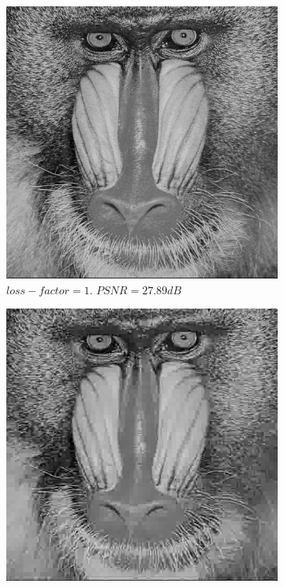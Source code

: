 \documentclass[11pt,a4paper]{article}
\begin{document}
\begin{figure}[ht]
	\centering
	\begin{subfigure}[h]{0.4\textwidth}
		\includegraphics[width=\textwidth]{mandril_lf1}
		\caption{$loss-factor = 1$. $PSNR = 27.89dB$}
		\label{mandril:1}
	\end{subfigure}
	\par\bigskip
	\begin{subfigure}[h]{0.4\textwidth}
		\includegraphics[width=\textwidth]{mandril_lf10}

\end{subfigure}
\end{figure}
\end{document}
